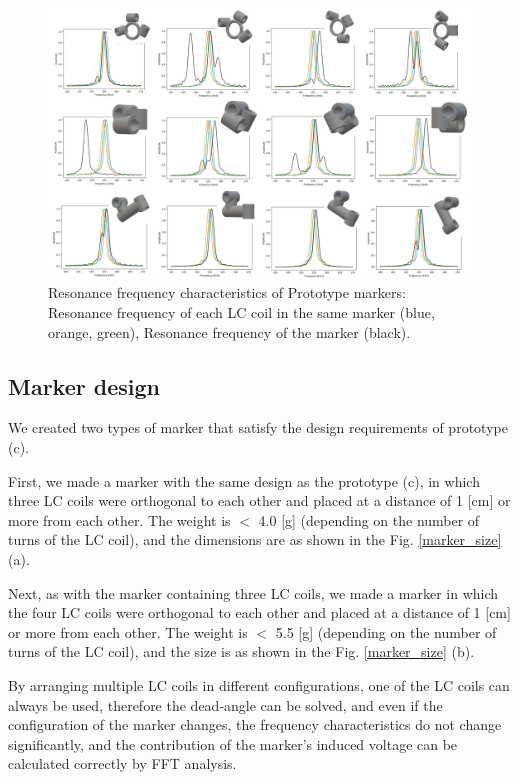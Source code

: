 \documentclass[journal,twoside,web]{ieeecolor}
\begin{document}
\begin{figure}[t]
\centerline{\includegraphics[width=2\columnwidth]{figure/frequency_characteristics.png}}
    \caption{Resonance frequency characteristics of Prototype markers: Resonance frequency of each LC coil in the same marker (blue, orange, green), Resonance frequency of the marker (black).}
    \label{freq_charac}
\end{figure}

\subsection{Marker design}
We created two types of marker that satisfy the design requirements of prototype (c). 

First, we made a marker with the same design as the prototype (c), in which three LC coils were orthogonal to each other and placed at a distance of 1 [cm] or more from each other. The weight is $<$ 4.0 [g] (depending on the number of turns of the LC coil), and the dimensions are as shown in the Fig. \ref{marker_size} (a). 

Next, as with the marker containing three LC coils, we made a marker in which the four LC coils were orthogonal to each other and placed at a distance of 1 [cm] or more from each other. The weight is $<$ 5.5 [g] (depending on the number of turns of the LC coil), and the size is as shown in the Fig. \ref{marker_size} (b). 

By arranging multiple LC coils in different configurations, one of the LC coils can always be used, therefore the dead-angle can be solved, and even if the configuration of the marker changes, the frequency characteristics do not change significantly, and the contribution of the marker's induced voltage can be calculated correctly by FFT analysis.
\end{document}
